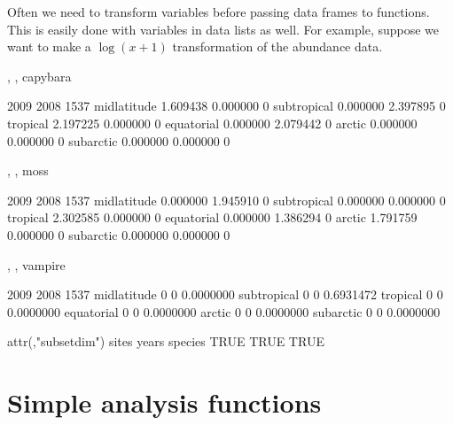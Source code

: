 \documentclass{article}
\numberwithin{exercise}{section}
\begin{document}
Often we need to transform variables before passing data frames to functions.  This is easily done with variables in data lists as well.  For example, suppose we want to make a $\log(x+1)$ transformation of the abundance data.
\begin{Schunk}
\begin{Soutput}
, , capybara

                2009     2008 1537
midlatitude 1.609438 0.000000    0
subtropical 0.000000 2.397895    0
tropical    2.197225 0.000000    0
equatorial  0.000000 2.079442    0
arctic      0.000000 0.000000    0
subarctic   0.000000 0.000000    0

, , moss

                2009     2008 1537
midlatitude 0.000000 1.945910    0
subtropical 0.000000 0.000000    0
tropical    2.302585 0.000000    0
equatorial  0.000000 1.386294    0
arctic      1.791759 0.000000    0
subarctic   0.000000 0.000000    0

, , vampire

            2009 2008      1537
midlatitude    0    0 0.0000000
subtropical    0    0 0.6931472
tropical       0    0 0.0000000
equatorial     0    0 0.0000000
arctic         0    0 0.0000000
subarctic      0    0 0.0000000

attr(,"subsetdim")
  sites   years species 
   TRUE    TRUE    TRUE 
\end{Soutput}
\end{Schunk}

\section{Simple analysis functions}
\end{document}
